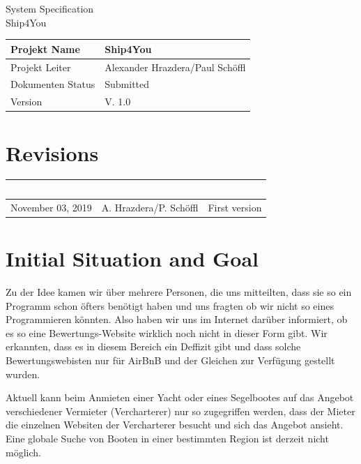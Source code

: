 \documentclass[12pt]{article}
\theoremstyle{definition}
\newcommand{\projectname}{Ship4You}
\newcommand{\productname}{Ship4You}
\newcommand{\projectleader}{Alexander Hrazdera/Paul Schöffl}
\newcommand{\documentstatus}{Submitted}
\newcommand{\version}{V. 1.0}
\begin{document}
\begin{titlepage}

\vspace{10em}

\begin{center}
{\Huge System Specification} \\[3em]
{\LARGE \productname} \\[3em]
\end{center}

\begin{flushleft} 
\begin{tabular}{|l|l|}
\hline
Projekt Name & \projectname \\ \hline
Projekt Leiter & \projectleader \\ \hline
Dokumenten Status & \documentstatus \\ \hline
Version & \version \\ \hline
\end{tabular}
\end{flushleft}

\end{titlepage}
\section*{Revisions}
\begin{tabular}{|l|l|l|}
\hline
\cellcolor[gray]{0.5}\textcolor{white}{Date} & \cellcolor[gray]{0.5}\textcolor{white}{Author} & \cellcolor[gray]{0.5}\textcolor{white}{Change} \\ \hline
November 03, 2019&A. Hrazdera/P. Schöffl&First version \\ \hline
\end{tabular}
\pagebreak
\tableofcontents
\pagebreak

\section{Initial Situation and Goal}
	Zu der Idee kamen wir über mehrere Personen, die uns mitteilten, dass sie so ein Programm schon öfters benötigt haben und uns fragten ob wir nicht so eines Programmieren könnten. Also haben wir uns im Internet darüber informiert, ob es so eine Bewertungs-Website wirklich noch nicht in dieser Form gibt.
	Wir erkannten, dass es in diesem Bereich ein Deffizit gibt und dass solche Bewertungswebisten nur für AirBnB und der Gleichen zur Verfügung gestellt wurden.
	
	Aktuell kann beim Anmieten einer Yacht oder eines Segelbootes auf das Angebot verschiedener Vermieter (Vercharterer) nur so zugegriffen werden, dass der Mieter die einzelnen Websiten der Vercharterer besucht und sich das Angebot ansieht. Eine globale Suche von Booten in einer bestimmten Region ist derzeit nicht möglich.
	
\end{document}
